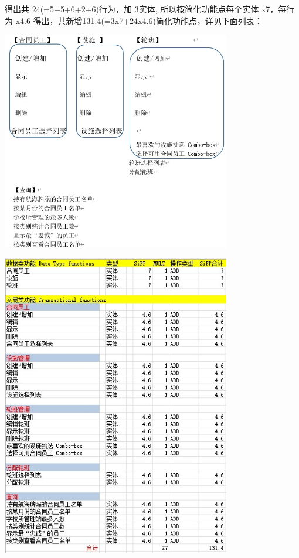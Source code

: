 得出共 24(=5+5+6+2+6)行为，加 3实体, 所以按简化功能点每个实体 x7，每行为
x4.6 得出，共新增131.4(=3x7+24x4.6)简化功能点，详见下面列表：



\includegraphics[width=10cm]{Ex1SoluScreenshot_2022-04-05_115926.jpg}


\includegraphics[width=10cm]{SifpEg1Screenshot_2023-03-15_204147.jpg}

